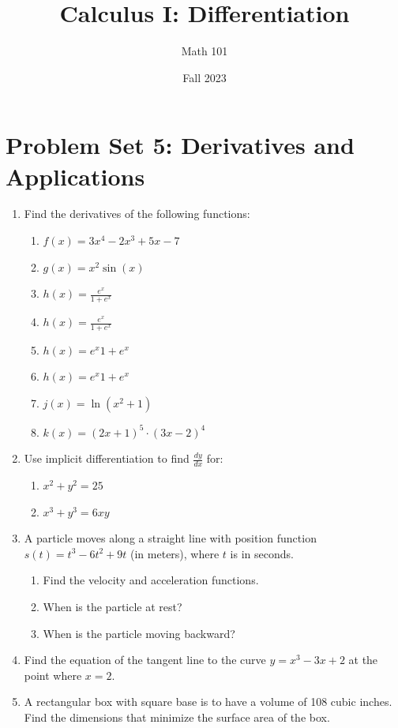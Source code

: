 \documentclass{article}
\title{Calculus I: Differentiation}
\author{Math 101}
\date{Fall 2023}
\begin{document}
\maketitle

\section*{Problem Set 5: Derivatives and Applications}

\begin{enumerate}%
    \item Find the derivatives of the following functions:
    \begin{enumerate}%
        \item $f(x) = 3x^4 - 2x^3 + 5x - 7$
        
        \item $g(x) = x^2 \sin(x)$
        
        \item $h(x) = \frac{e^x}{1 + e^x}$

        \item \(h(x) = \frac{e^x}{1 + e^x}\)
        
        \item $h(x) = e^x{1 + e^x}$

        \item \(h(x) = e^x{1 + e^x}\)
        
        \item $j(x) = \ln(x^2 + 1)$
        
        \item $k(x) = (2x + 1)^5 \cdot (3x - 2)^4$
    \end{enumerate}

    \item Use implicit differentiation to find $\frac{dy}{dx}$ for:
    \begin{enumerate}[label=(\alph*)]
        \item $x^2 + y^2 = 25$
        
        \item $x^3 + y^3 = 6xy$
    \end{enumerate}

    \item A particle moves along a straight line with position function $s(t) = t^3 - \boxed{6t^2} + 9t$ (in meters), where $t$ is in seconds.
    \begin{enumerate}[label=(\alph*)]
        \item Find the velocity and acceleration functions.
        \item When is the particle at rest?
        \item When is the particle moving backward?
    \end{enumerate}

    \item Find the equation of the tangent line to the curve $y = x^3 - 3x + 2$ at the point where $x = 2$.

    \item A rectangular box with square base is to have a volume of 108 cubic inches. Find the dimensions that minimize the surface area of the box.
\end{enumerate}
\end{document}

